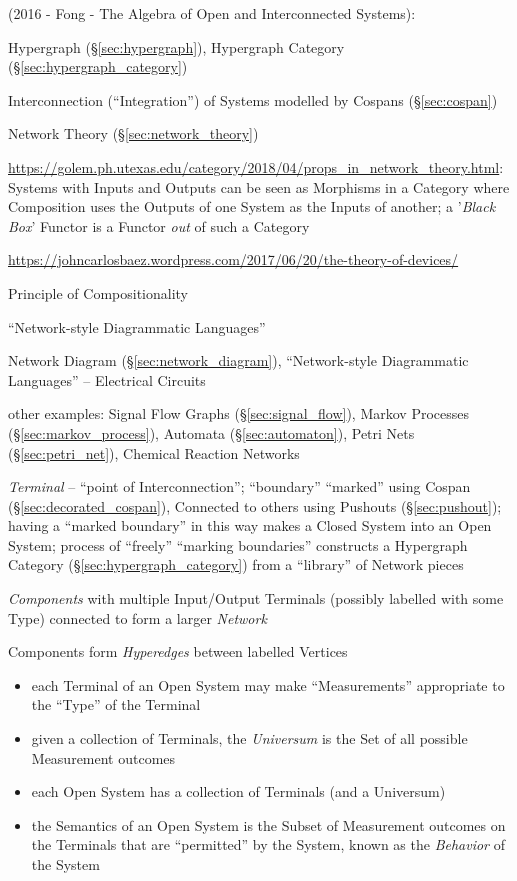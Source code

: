 (2016 - Fong - The Algebra of Open and Interconnected Systems):

\fist Hypergraph (\S\ref{sec:hypergraph}), Hypergraph Category
(\S\ref{sec:hypergraph_category})

Interconnection (``Integration'') of Systems modelled by Cospans
(\S\ref{sec:cospan})

\fist Network Theory (\S\ref{sec:network_theory})

\url{https://golem.ph.utexas.edu/category/2018/04/props_in_network_theory.html}:
Systems with Inputs and Outputs can be seen as Morphisms in a Category where
Composition uses the Outputs of one System as the Inputs of another; a
'\emph{Black Box}' Functor is a Functor \emph{out} of such a Category

\url{https://johncarlosbaez.wordpress.com/2017/06/20/the-theory-of-devices/}

Principle of Compositionality

``Network-style Diagrammatic Languages''

Network Diagram (\S\ref{sec:network_diagram}), ``Network-style
Diagrammatic Languages'' -- Electrical Circuits

other examples: Signal Flow Graphs (\S\ref{sec:signal_flow}),
Markov Processes (\S\ref{sec:markov_process}), Automata
(\S\ref{sec:automaton}), Petri Nets (\S\ref{sec:petri_net}), Chemical
Reaction Networks

\emph{Terminal} -- ``point of Interconnection''; ``boundary''
``marked'' using Cospan (\S\ref{sec:decorated_cospan}), Connected to
others using Pushouts (\S\ref{sec:pushout}); having a ``marked
boundary'' in this way makes a Closed System into an Open System;
process of ``freely''  ``marking boundaries'' constructs a Hypergraph
Category (\S\ref{sec:hypergraph_category}) from a ``library'' of
Network pieces

\emph{Components} with multiple Input/Output Terminals (possibly
labelled with some Type) connected to form a larger \emph{Network}

Components form \emph{Hyperedges} between labelled Vertices

\begin{itemize}
  \item each Terminal of an Open System may make ``Measurements''
    appropriate to the ``Type'' of the Terminal
  \item given a collection of Terminals, the \emph{Universum} is the
    Set of all possible Measurement outcomes
  \item each Open System has a collection of Terminals (and a Universum)
  \item the Semantics of an Open System is the Subset of Measurement
    outcomes on the Terminals that are ``permitted'' by the System,
    known as the \emph{Behavior} of the System
\end{itemize}

